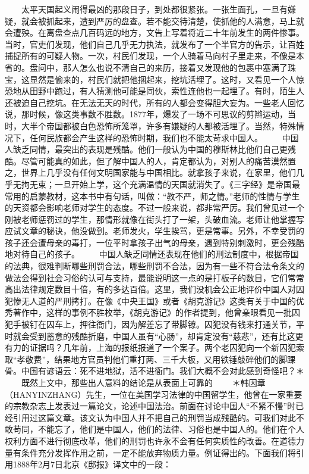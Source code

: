 \documentclass[12pt,oneside]{book}
\begin{document}
\begin{common-format}
　　太平天国起义闹得最凶的那段日子，到处都很紧张。一张生面孔，一旦有嫌疑，就会被抓起来，遭到严厉的盘查。若不能交待清楚，使抓他的人满意，马上就会遭殃。在离盘查点几百码远的地方，文告上写着将近二十年前发生的两件惨事。当时，官吏们发现，他们自己几乎无力执法，就发布了一个半官方的告示，让百姓捕捉所有的可疑人物。一次，村民们发现，一个人骑着马向村子里走来，不像是本省的。盘问中，那人怎么也说不清自己的来历，接着又发现他的包裹中塞满了珠宝，这显然是偷来的，村民们就把他捆起来，挖坑活埋了。这时，又看见一个人惊恐地从田野中跑过，有人猜测他可能是同伙，索性连他也一起埋了。有时，陌生人还被迫自己挖坑。在无法无天的时代，所有的人都会变得胆大妄为。一些老人回忆说，那时候，像这类事数不胜数。1877年，爆发了一场不可思议的剪辫运动，当时，大半个帝国都被白色恐怖所笼罩，许多有嫌疑的人都被活埋了。当然，特殊情况下，任何民族都会产生这样的恐怖时期，我们也不能太苛求中国人。 
　　中国人缺乏同情，最突出的表现是残酷。他们一般认为中国的穆斯林比他们自己更残酷。尽管可能真的如此，但了解中国人的人，肯定都认为，对别人的痛苦漠然置之，世界上几乎没有任何文明国家能与中国相比。就拿孩子来说，在家里，他们几乎无拘无束；一旦开始上学，这个充满温情的天国就消失了。《三字经》是帝国最常用的启蒙教材，这本书中有句话，叫做：“教不严，师之情。”老师的性情与学生的天资都会影响老师对学生的态度。不过一般来说，都非常严厉。我们曾见过一个刚被老师惩罚过的学生，那情形就像在街头打了一架，头破血流。老师让他掌握写应试文章的秘诀，他没做到。老师发火，学生挨骂，更是常事。另外，不幸受罚的孩子还会遭母亲的毒打，一位平时拿孩子出气的母亲，遇到特别刺激时，更会残酷地对待自己的孩子。 
　　中国人缺乏同情还表现在他们的刑法制度中，根据帝国的法典，很难判断哪些刑罚合法，哪些刑罚不合法，因为有一些不符合法令条文的做法会得到社会习俗的认可与支持，最能说明这一点的是打板子的数目，它们常常高出法律规定数目十倍，有的多达百倍。这里，我们没机会公正地评价中国人对囚犯惨无人道的严刑拷打。在像《中央王国》或者《胡克游记》这类有关于中国的优秀著作中，这样的事例不胜枚举，《胡克游记》的作者提到，他曾亲眼看见一批囚犯手被钉在囚车上，押往衙门，因为解差忘了带脚镣。囚犯没有钱来打通关节，平时就会受到蓄意的残酷折磨，中国人虽有“心肠”，却肯定没有“慈悲”，还有比这更有力的证据吗？几年前，上海的报纸报道了一个案子。两个老囚犯向一个新囚犯索取“孝敬费”，结果地方官员判他们重打两、三千大板，又用铁锤敲碎他们的脚踝骨。中国有谚语云：死不进地狱，活不进衙门。我们大概不会对此感到奇怪吧？＊ 
　　既然上文中，那些出人意料的结论是从表面上可靠的 
　　＊韩因章（HANYINZHANG）先生，一位在美国学习法律的中国留学生，他曾在一家重要的宗教杂志上发表过一篇论文，论述中国法治。前面在讨论中国人“不紧不慢”时已经引用过这篇文章。该文认为中国人并不把自己的刑罚当成残酷的。可我们对此不敢苟同，不能忘了，他们是中国人，他们的法律、习俗也是中国人的。他们在个人权利方面不进行彻底改革，他们的刑罚也许永不会有任何实质性的改善。在道德力量有条件充分发挥作用之前，一定不能放弃物质力量。例证得出的。下面我们将引用1888年2月7日北京《邸报》译文中的一段： 

\end{common-format}
\end{document}
